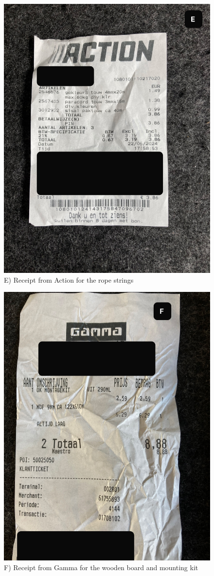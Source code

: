 \documentclass[a4paper]{article}
\begin{document}
\begin{figure}[h]
    \centering
    \includegraphics[width=1\textwidth]{ropes.jpg}
    \caption{E) Receipt from Action for the rope strings}
    \label{fig:mesh1}
\end{figure}

\begin{figure}[h]
    \centering
    \includegraphics[width=1\textwidth]{wood.jpg}
    \caption{F) Receipt from Gamma for the wooden board and mounting kit}
    \label{fig:mesh1}
\end{figure}
\end{document}
